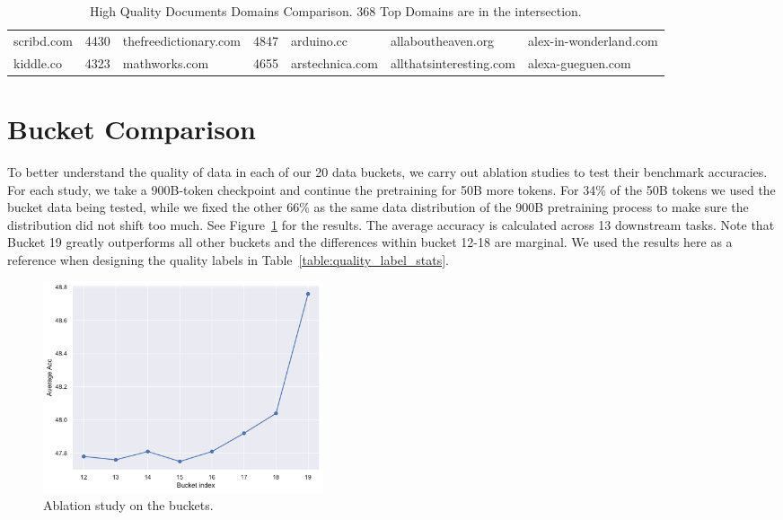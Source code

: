\documentclass[11pt]{article}
\begin{document}
\begin{table}[thb]
{\begin{tabular}{|lclclll|}
scribd.com & \multicolumn{1}{c|}{4430} & thefreedictionary.com & \multicolumn{1}{c|}{4847} & \multicolumn{1}{l|}{{ {arduino.cc}}} & \multicolumn{1}{l|}{{ {allaboutheaven.org}}} & { {alex-in-wonderland.com}} \\
kiddle.co & \multicolumn{1}{c|}{4323} & mathworks.com & \multicolumn{1}{c|}{4655} & \multicolumn{1}{l|}{{ {arstechnica.com}}} & \multicolumn{1}{l|}{{ {allthatsinteresting.com}}} & { {alexa-gueguen.com}} \\ \hline
\end{tabular}
}
\caption{High Quality Documents Domains Comparison. 368 Top Domains are in the intersection.}
\label{table:ap-domain-comparision}
\end{table}



\section{Bucket Comparison} 

To better understand the quality of data in each of our 20 data buckets, we carry out ablation studies to test their benchmark accuracies. For each study, we take a 900B-token checkpoint and continue the pretraining for 50B more tokens. For 34\% of the 50B tokens we used the bucket data being tested, while we fixed the other 66\% as the same data distribution of the 900B pretraining process to make sure the distribution did not shift too much. See Figure~\ref{fig:ablation_buckets} for the results. The average accuracy is calculated across 13 downstream tasks. Note that Bucket 19 greatly outperforms all other buckets and the differences within bucket 12-18 are marginal. We used the results here as a reference when designing the quality labels in Table~\ref{table:quality_label_stats}. 

\begin{figure}[htbp]
\centering
\includegraphics[width=0.4\textwidth]{figures/ablation_buckets.pdf}
\caption{Ablation study on the buckets.}
\label{fig:ablation_buckets}
\end{figure}
\end{document}
